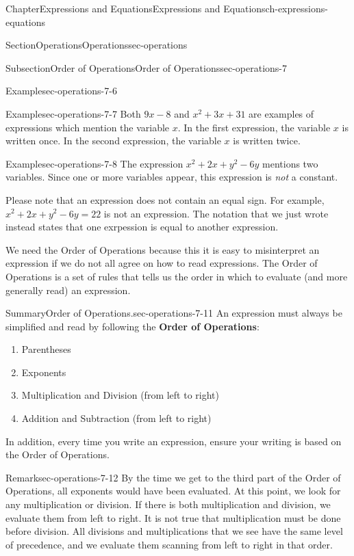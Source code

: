 \documentclass[twoside,11pt,]{book}
\newcommand{\terminology}[1]{\textbf{#1}}
\numberwithin{equation}{chapter}
\begin{document}
\begin{chapterptx}{Chapter}{Expressions and Equations}{}{Expressions and Equations}{}{}{ch-expressions-equations}
\begin{sectionptx}{Section}{Operations}{}{Operations}{}{}{sec-operations}
\begin{subsectionptx}{Subsection}{Order of Operations}{}{Order of Operations}{}{}{sec-operations-7}
\begin{example}{Example}{}{sec-operations-7-6}
\end{example}
\begin{example}{Example}{}{sec-operations-7-7}%
Both \(9x-8\) and \(x^2+3x+31\) are examples of expressions which mention the variable \(x\). In the first expression, the variable \(x\) is written once. In the second expression, the variable \(x\) is written twice.%
\end{example}
\begin{example}{Example}{}{sec-operations-7-8}%
The expression \(x^2+2x+y^2-6y\) mentions two variables. Since one or more variables appear, this expression is \emph{not} a constant.%
\end{example}
Please note that an expression does not contain an equal sign. For example, \(x^2+2x+y^2-6y=22\) is not an expression. The notation that we just wrote instead states that one exrpession is equal to another expression.%
\par
We need the Order of Operations because this it is easy to misinterpret an expression if we do not all agree on how to read expressions. The Order of Operations is a set of rules that tells us the order in which to evaluate (and more generally read) an expression.%
\begin{assemblage}{Summary}{Order of Operations.}{sec-operations-7-11}%
An expression must always be simplified and read by following the \terminology{Order of Operations}:%
\begin{enumerate}
\item{}Parentheses%
\item{}Exponents%
\item{}Multiplication and Division (from left to right)%
\item{}Addition and Subtraction (from left to right)%
\end{enumerate}
In addition, every time you write an expression, ensure your writing is based on the Order of Operations.%
\end{assemblage}
\begin{remark}{Remark}{}{sec-operations-7-12}%
By the time we get to the third part of the Order of Operations, all exponents would have been evaluated. At this point, we look for any multiplication or division. If there is both multiplication and division, we evaluate them from left to right. It is not true that multiplication must be done before division. All divisions and multiplications that we see have the same level of precedence, and we evaluate them scanning from left to right in that order.%
\end{remark}

\end{subsectionptx}
\end{sectionptx}
\end{chapterptx}
\end{document}
